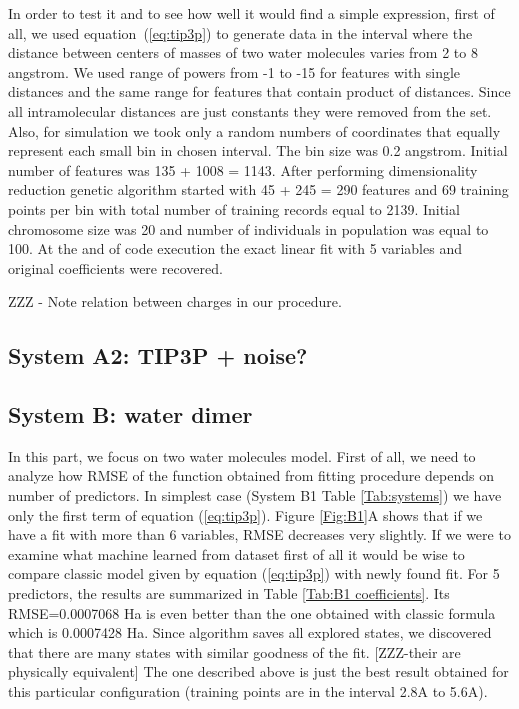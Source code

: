 \documentclass[aps,prl,reprint,amsmath,amssymb,nature]{revtex4-1}
\begin{document}
In order to test it and to see how well it would find a simple expression, first of all, we used equation~(\ref{eq:tip3p}) to generate data in the interval where the distance between centers of masses of two water molecules varies from 2 to 8 angstrom. We used range of powers from -1 to -15 for features with single distances and the same range for features that contain product of distances. Since all intramolecular distances are just constants they were removed from the set. Also, for simulation we took only a random numbers of coordinates that equally represent each small bin in chosen interval. The bin size was 0.2 angstrom. Initial number of features was 135 + 1008 = 1143. After performing dimensionality reduction genetic algorithm started with 45 + 245 = 290 features and 69 training points per bin with total number of training records equal to  2139. Initial chromosome size was 20 and number of individuals in population was equal to 100. At the and of code execution the exact linear fit with 5 variables and original coefficients were recovered.

ZZZ - Note relation between charges in our procedure.

\subsection{System A2: TIP3P + noise?}

\subsection{System B: water dimer}


In this part, we focus on two water molecules model. First of all, we need to analyze how RMSE of the function obtained from fitting procedure depends on number of predictors. In simplest case (System B1 Table \ref{Tab:systems}) we have only the first term of equation (\ref{eq:tip3p}). Figure \ref{Fig:B1}A shows that if we have a fit with more than 6 variables, RMSE decreases very slightly. If we were to examine what machine learned from dataset first of all it would be wise to compare classic model given by equation (\ref{eq:tip3p}) with newly found fit. For 5 predictors, the results are summarized in Table \ref{Tab:B1 coefficients}. Its RMSE=0.0007068 Ha is even better than the one obtained with classic formula which is 0.0007428 Ha. Since algorithm saves all explored states, we discovered that there are many states with similar goodness of the fit. [ZZZ-their are physically equivalent] The one described above is just the best result obtained for this particular configuration (training points are in the interval 2.8A to 5.6A).
\end{document}
